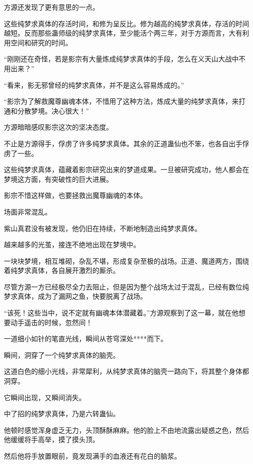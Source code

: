 
\begin{this_body}

方源还发现了更有意思的一点。

这些纯梦求真体的存活时间，和修为呈反比。修为越高的纯梦求真体，存活的时间越短。反而那些蛊师级的纯梦求真体，至少能活个两三年，对于方源而言，大有利用空间和研究的时间。

“刚刚还在奇怪，若是影宗有大量炼成纯梦求真体的手段，怎么在义天山大战中不用出来？”

“看来，影无邪曾经的纯梦求真体，并不是这么容易炼成的。”

“影宗为了解救魔尊幽魂本体，不惜用了这种方法，炼成大量的纯梦求真体，来打通和分散梦境。决心很大！”

方源暗暗感叹影宗这次的坚决态度。

不止是方源得手，俘虏了许多纯梦求真体。其余的正道蛊仙也不笨，也各自出手俘虏了一些。

这些纯梦求真体，蕴藏着影宗研究出来的梦道成果。一旦被研究成功，他人都会在梦境这方面，有突破性的巨大进展。

影宗不惜这样做，也要拯救出魔尊幽魂的本体。

场面非常混乱。

紫山真君没有被发现，他仍旧在持续，不断地制造出纯梦求真体。

越来越多的光茧，接连不绝地出现在梦境中。

一块块梦境，相互堆砌，杂乱不堪，形成复杂至极的战场。正道、魔道两方，围绕着纯梦求真体，各自展开激烈的厮杀。

尽管方源一方已经极尽全力去阻止，但是因为整个战场太过于混乱，已经有数位纯梦求真体，成为了漏网之鱼，快要脱离了战场。

“该死！这些当中，说不定就有幽魂本体潜藏着。”方源观察到了这一幕，就在他想要动手遥击的时候，忽然间！

一道细小如针的笔直光线，瞬间从苍穹深处****而下。

瞬间，洞穿了一个纯梦求真体的脑壳。

这道白色的细小光线，非常犀利，从纯梦求真体的脑壳一路向下，将其整个身体都洞穿。

它瞬间出现，又瞬间消失。

中了招的纯梦求真体，乃是六转蛊仙。

他顿时感觉浑身虚乏无力，头顶酥酥麻麻。他的脸上不由地流露出疑惑之色，然后他缓缓将手高举，摸了摸头顶。

然后他将手放置眼前，竟发现满手的血液还有花白的脑浆。


\end{this_body}
